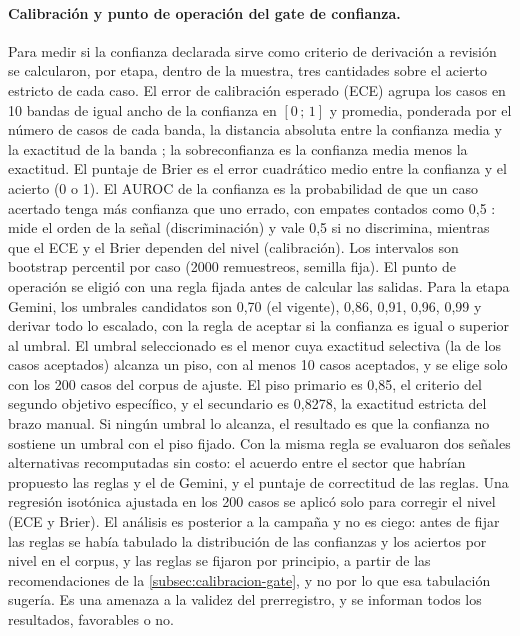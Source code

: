 \paragraph{Calibración y punto de operación del gate de confianza.} Para medir si la confianza declarada sirve como criterio de derivación a revisión se calcularon, por etapa, dentro de la muestra, tres cantidades sobre el acierto estricto de cada caso. El error de calibración esperado (ECE) agrupa los casos en 10 bandas de igual ancho de la confianza en \([0\,;\,1]\) y promedia, ponderada por el número de casos de cada banda, la distancia absoluta entre la confianza media y la exactitud de la banda \parencite{Guo2017_calibration}; la sobreconfianza es la confianza media menos la exactitud. El puntaje de Brier \parencite{Brier1950_verification} es el error cuadrático medio entre la confianza y el acierto (0 o 1). El AUROC de la confianza es la probabilidad de que un caso acertado tenga más confianza que uno errado, con empates contados como 0,5 \parencite{Sokolova2009_performance_measures}: mide el orden de la señal (discriminación) y vale 0,5 si no discrimina, mientras que el ECE y el Brier dependen del nivel (calibración). Los intervalos son bootstrap percentil por caso (2000 remuestreos, semilla fija). El punto de operación se eligió con una regla fijada antes de calcular las salidas. Para la etapa Gemini, los umbrales candidatos son 0,70 (el vigente), 0,86, 0,91, 0,96, 0,99 y derivar todo lo escalado, con la regla de aceptar si la confianza es igual o superior al umbral. El umbral seleccionado es el menor cuya exactitud selectiva (la de los casos aceptados) alcanza un piso, con al menos 10 casos aceptados, y se elige solo con los 200 casos del corpus de ajuste. El piso primario es 0,85, el criterio del segundo objetivo específico, y el secundario es 0,8278, la exactitud estricta del brazo manual. Si ningún umbral lo alcanza, el resultado es que la confianza no sostiene un umbral con el piso fijado. Con la misma regla se evaluaron dos señales alternativas recomputadas sin costo: el acuerdo entre el sector que habrían propuesto las reglas y el de Gemini, y el puntaje de correctitud de las reglas. Una regresión isotónica ajustada en los 200 casos se aplicó solo para corregir el nivel (ECE y Brier). El análisis es posterior a la campaña y no es ciego: antes de fijar las reglas se había tabulado la distribución de las confianzas y los aciertos por nivel en el corpus, y las reglas se fijaron por principio, a partir de las recomendaciones de la \autoref{subsec:calibracion-gate}, y no por lo que esa tabulación sugería. Es una amenaza a la validez del prerregistro, y se informan todos los resultados, favorables o no.

